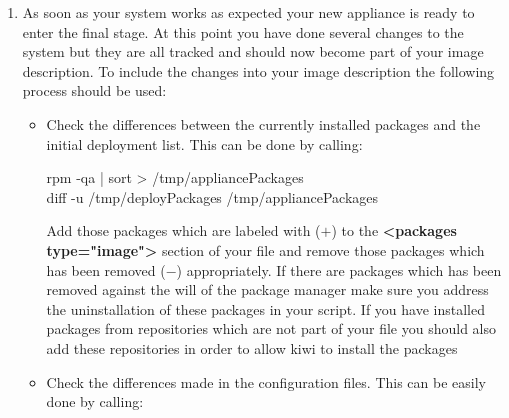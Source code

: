 \begin{enumerate}
\begin{itemize}
            \begin{Command}{10cm}
            rpm -qa | sort > /tmp/deployPackages
            \end{Command}

      \item Check the output of the command  and
            include everything which is unknown to git and surely
            will not be changed by you and will not become part of the
            image description overlay files to the 
            files
      \end{itemize}

      After the initial package list exists and the git repository is
      clean you can start to configure the system. You never should
      install additional software just by installing an unmanaged archive
      or build and install from source. It's very hard to find out
      what binary files had been installed and it's also not architecture
      safe. If there is really no other way for the software to become
      part of the image you should address this issue directly in your
      image description and the config.sh script but not after the initial
      deployment has happened.
\item As soon as your system works as expected your new appliance is
      ready to enter the final stage. At this point you have done several
      changes to the system but they are all tracked and should now become
      part of your image description. To include the changes into your
      image description the following process should be used:
      \begin{itemize}
      \item Check the differences between the currently installed packages
            and the initial deployment list. This can be done by calling:

            \begin{Command}{12cm}
            rpm -qa | sort > /tmp/appliancePackages\\
            diff -u /tmp/deployPackages /tmp/appliancePackages
            \end{Command}

            Add those packages which are labeled with ($+$) to the
            \textbf{<packages type="image">} section of your 
            file and remove those packages which has been removed ($-$)
            appropriately. If there are packages which has been removed
            against the will of the package manager make sure you address
            the uninstallation of these packages in your 
            script. If you have installed packages from repositories which
            are not part of your  file you should also add these
            repositories in order to allow kiwi to install the packages
      \item Check the differences made in the configuration files. This
            can be easily done by calling:


\end{itemize}
\end{enumerate}
